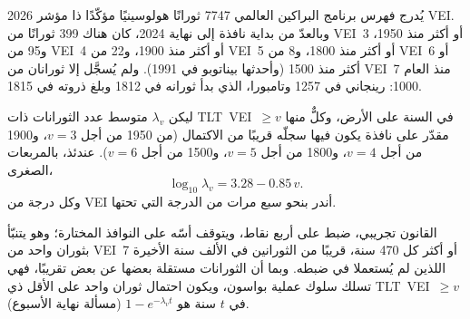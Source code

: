 \begin{dated}{2026}
يُدرج فهرس برنامج البراكين العالمي \num{7747} ثورانًا هولوسينيًا مؤكّدًا
ذا مؤشر VEI. وبالعدّ من بداية نافذة إلى نهاية 2024، كان هناك
399 ثورانًا من VEI~3 أو أكثر منذ 1950، و95 من VEI~4 أو أكثر منذ 1900،
و22 من VEI~5 أو أكثر منذ 1800، و8 من VEI~6 أو أكثر منذ 1500 (وأحدثها
بيناتوبو في 1991). ولم يُسجَّل إلا ثورانان من VEI~7 منذ العام
1000: رينجاني في 1257 وتامبورا، الذي بدأ ثورانه في 1812 وبلغ ذروته في
1815.
\end{dated}

\begin{proposition}\label{prop:b2:eruptive-styles:frequency}
ليكن $\lambda_v$ متوسط عدد الثورانات ذات \mbox{\textdir TLT VEI $\ge v$} في السنة على الأرض،
وكلٌّ منها مقدّر على نافذة يكون فيها سجلّه قريبًا من الاكتمال (من 1950
من أجل $v = 3$، و1900 من أجل $v = 4$، و1800 من أجل $v = 5$، و1500 من أجل $v = 6$). عندئذ، بالمربعات
الصغرى،
\[
\log_{10}\lambda_v = 3.28 - 0.85\,v .
\]
وكل درجة من VEI أندر بنحو سبع مرات من الدرجة التي تحتها.
\end{proposition}

القانون تجريبي، ضبط على أربع نقاط، ويتوقف أسّه على
النوافذ المختارة؛ وهو يتنبّأ بثوران واحد من VEI~7 أو أكثر كل \num{470} سنة،
قريبًا من الثورانين في الألف سنة الأخيرة اللذين لم يُستعملا في ضبطه. وبما أن
الثورانات مستقلة بعضها عن بعض تقريبًا، فهي تسلك سلوك عملية
بواسون، ويكون احتمال ثوران واحد على الأقل ذي \mbox{\textdir TLT VEI $\ge v$} في $t$ سنة
هو $1 - e^{-\lambda_vt}$ (مسألة نهاية الأسبوع).

